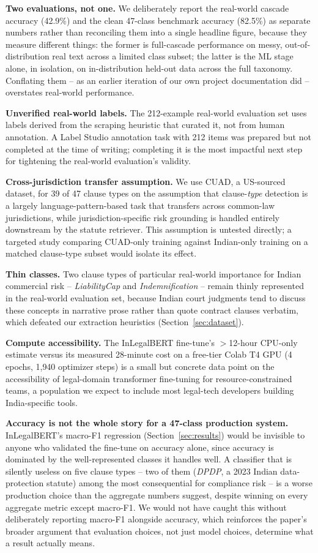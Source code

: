 \documentclass[conference]{IEEEtran}
\begin{document}
\textbf{Two evaluations, not one.} We deliberately report the real-world cascade accuracy (42.9\%) and the clean 47-class benchmark accuracy (82.5\%) as separate numbers rather than reconciling them into a single headline figure, because they measure different things: the former is full-cascade performance on messy, out-of-distribution real text across a limited class subset; the latter is the ML stage alone, in isolation, on in-distribution held-out data across the full taxonomy. Conflating them -- as an earlier iteration of our own project documentation did -- overstates real-world performance.

\textbf{Unverified real-world labels.} The 212-example real-world evaluation set uses labels derived from the scraping heuristic that curated it, not from human annotation. A Label Studio annotation task with 212 items was prepared but not completed at the time of writing; completing it is the most impactful next step for tightening the real-world evaluation's validity.

\textbf{Cross-jurisdiction transfer assumption.} We use CUAD, a US-sourced dataset, for 39 of 47 clause types on the assumption that clause-\emph{type} detection is a largely language-pattern-based task that transfers across common-law jurisdictions, while jurisdiction-specific risk grounding is handled entirely downstream by the statute retriever. This assumption is untested directly; a targeted study comparing CUAD-only training against Indian-only training on a matched clause-type subset would isolate its effect.

\textbf{Thin classes.} Two clause types of particular real-world importance for Indian commercial risk -- \textit{LiabilityCap} and \textit{Indemnification} -- remain thinly represented in the real-world evaluation set, because Indian court judgments tend to discuss these concepts in narrative prose rather than quote contract clauses verbatim, which defeated our extraction heuristics (Section~\ref{sec:dataset}).

\textbf{Compute accessibility.} The InLegalBERT fine-tune's $>$12-hour CPU-only estimate versus its measured 28-minute cost on a free-tier Colab T4 GPU (4 epochs, 1{,}940 optimizer steps) is a small but concrete data point on the accessibility of legal-domain transformer fine-tuning for resource-constrained teams, a population we expect to include most legal-tech developers building India-specific tools.

\textbf{Accuracy is not the whole story for a 47-class production system.} InLegalBERT's macro-F1 regression (Section~\ref{sec:results}) would be invisible to anyone who validated the fine-tune on accuracy alone, since accuracy is dominated by the well-represented classes it handles well. A classifier that is silently useless on five clause types -- two of them (\textit{DPDP}, a 2023 Indian data-protection statute) among the most consequential for compliance risk -- is a worse production choice than the aggregate numbers suggest, despite winning on every aggregate metric except macro-F1. We would not have caught this without deliberately reporting macro-F1 alongside accuracy, which reinforces the paper's broader argument that evaluation choices, not just model choices, determine what a result actually means.
\end{document}
